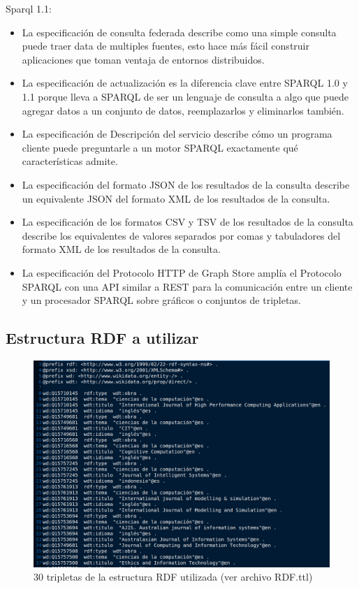 \documentclass[conference]{IEEEtran}
\begin{document}
Sparql 1.1: 

\begin{itemize}
	\item La especificación de consulta federada describe como una simple consulta puede traer data de multiples fuentes, esto hace más fácil construir aplicaciones que toman ventaja de entornos distribuidos.
	\item La especificación de actualización es la diferencia clave entre SPARQL 1.0 y 1.1 porque lleva a SPARQL de ser un lenguaje de consulta a algo que puede agregar datos a un conjunto de datos, reemplazarlos y eliminarlos también.
	\item La especificación de Descripción del servicio describe cómo un programa cliente puede preguntarle a un motor SPARQL exactamente qué características admite.
	\item La especificación del formato JSON de los resultados de la consulta describe un equivalente JSON del formato XML de los resultados de la consulta.
	\item La especificación de los formatos CSV y TSV de los resultados de la consulta describe los equivalentes de valores separados por comas y tabuladores del formato XML de los resultados de la consulta.
	\item La especificación del Protocolo HTTP de Graph Store amplía el Protocolo SPARQL con una API similar a REST para la comunicación entre un cliente y un procesador SPARQL sobre gráficos o conjuntos de tripletas. 
	
\end{itemize}

\subsection{Estructura RDF a utilizar}

\begin{figure}[H]
\includegraphics[scale=0.2]{imagenes/estruc_rdf_30.png} 
\caption{30 tripletas de la estructura RDF utilizada (ver archivo RDF.ttl) }
\end{figure} 
\end{document}

